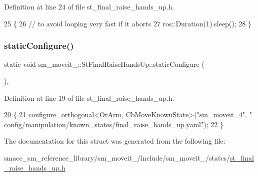 Definition at line 24 of file st\+\_\+final\+\_\+raise\+\_\+hands\+\_\+up.\+h.


\begin{DoxyCode}
25     \{
26         \textcolor{comment}{// to avoid looping very fast if it aborts}
27         ros::Duration(1).sleep();
28     \}
\end{DoxyCode}
\mbox{\label{structsm__moveit__4_1_1StFinalRaiseHandsUp_aabce6ade1a08aa3de0a2cfc1f33810bb}} 
\subsubsection{\texorpdfstring{static\+Configure()}{staticConfigure()}}
{\footnotesize\ttfamily static void sm\+\_\+moveit\+\_\+::\+St\+Final\+Raise\+Hands\+Up\+::static\+Configure (\begin{DoxyParamCaption}{ }\end{DoxyParamCaption})\hspace{0.3cm}{\ttfamily [inline]}, {\ttfamily [static]}}



Definition at line 19 of file st\+\_\+final\+\_\+raise\+\_\+hands\+\_\+up.\+h.


\begin{DoxyCode}
20     \{
21         configure\_orthogonal<OrArm, CbMoveKnownState>(\textcolor{stringliteral}{"sm\_moveit\_4"}, \textcolor{stringliteral}{"
      config/manipulation/known\_states/final\_raise\_hands\_up.yaml"});
22     \}
\end{DoxyCode}


The documentation for this struct was generated from the following file\+:\begin{DoxyCompactItemize}
\item 
smacc\+\_\+sm\+\_\+reference\+\_\+library/sm\+\_\+moveit\+\_/include/sm\+\_\+moveit\+\_/states/\hyperlink{st__final__raise__hands__up_8h}{st\+\_\+final\+\_\+raise\+\_\+hands\+\_\+up.\+h}\end{DoxyCompactItemize}
